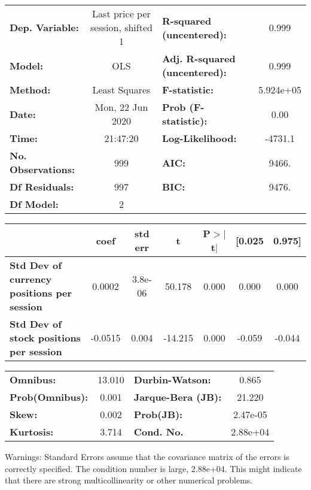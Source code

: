 \begin{center}
\begin{tabular}{lclc}
\toprule
\textbf{Dep. Variable:}                            & Last price per session, shifted 1 & \textbf{  R-squared (uncentered):}      &     0.999   \\
\textbf{Model:}                                    &                OLS                & \textbf{  Adj. R-squared (uncentered):} &     0.999   \\
\textbf{Method:}                                   &           Least Squares           & \textbf{  F-statistic:       }          & 5.924e+05   \\
\textbf{Date:}                                     &          Mon, 22 Jun 2020         & \textbf{  Prob (F-statistic):}          &     0.00    \\
\textbf{Time:}                                     &              21:47:20             & \textbf{  Log-Likelihood:    }          &   -4731.1   \\
\textbf{No. Observations:}                         &                  999              & \textbf{  AIC:               }          &     9466.   \\
\textbf{Df Residuals:}                             &                  997              & \textbf{  BIC:               }          &     9476.   \\
\textbf{Df Model:}                                 &                    2              & \textbf{                     }          &             \\
\bottomrule
\end{tabular}
\begin{tabular}{lcccccc}
                                                   & \textbf{coef} & \textbf{std err} & \textbf{t} & \textbf{P$> |$t$|$} & \textbf{[0.025} & \textbf{0.975]}  \\
\midrule
\textbf{Std Dev of currency positions per session} &       0.0002  &      3.8e-06     &    50.178  &         0.000        &        0.000    &        0.000     \\
\textbf{Std Dev of stock positions per session}    &      -0.0515  &        0.004     &   -14.215  &         0.000        &       -0.059    &       -0.044     \\
\bottomrule
\end{tabular}
\begin{tabular}{lclc}
\textbf{Omnibus:}       & 13.010 & \textbf{  Durbin-Watson:     } &    0.865  \\
\textbf{Prob(Omnibus):} &  0.001 & \textbf{  Jarque-Bera (JB):  } &   21.220  \\
\textbf{Skew:}          &  0.002 & \textbf{  Prob(JB):          } & 2.47e-05  \\
\textbf{Kurtosis:}      &  3.714 & \textbf{  Cond. No.          } & 2.88e+04  \\
\bottomrule
\end{tabular}
\end{center}

Warnings: \newline
 [1] Standard Errors assume that the covariance matrix of the errors is correctly specified. \newline
 [2] The condition number is large, 2.88e+04. This might indicate that there are \newline
 strong multicollinearity or other numerical problems.